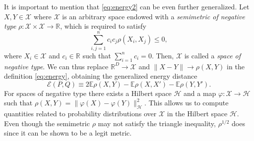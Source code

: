 \documentclass[aps,preprint,nofootinbib,floatfix]{revtex4-1}
\newcommand\Energy{\mathcal{E}}
\newcommand\E{\mathbb{E}}
\begin{document}
It is important to 
mention that \eqref{eq:energy2} can be even further generalized.
Let $X, Y \in \mathcal{X}$  where $\mathcal{X}$ is an arbitrary space endowed
with a \emph{semimetric of negative type}
$\rho: \mathcal{X}\times\mathcal{X} \to \mathbb{R}$, which is required
to satisfy
\begin{equation}
\label{eq:negative_type}
\sum_{i,j=1}^n c_i c_j \rho(X_i, X_j) \le 0,
\end{equation}
where $X_i \in \mathcal{X}$ and $c_i \in \mathbb{R}$ such that
$\sum_{i=1}^n c_i = 0$. Then, $\mathcal{X}$ is called a \emph{space of
negative type}.
We can thus replace $\mathbb{R}^D \to \mathcal{X}$ and 
$\| X - Y \| \to \rho(X , Y)$ in the definition \eqref{eq:energy}, obtaining
the generalized energy distance
\begin{equation}
\label{eq:energy3}
\Energy(P, Q) \equiv 2 \E \rho(X,Y) - \E \rho(X, X') - \E \rho(Y,Y').
\end{equation}
For spaces of negative type there exists a Hilbert space $\mathcal{H}$ and
a map $\varphi: \mathcal{X} \to
\mathcal{H}$ such that
$\rho(X, Y) = \| \varphi(X) - \varphi(Y) \|_{\mathcal{H}}^2$. This
allows us to compute quantities related to probability distributions over
$\mathcal{X}$ in the Hilbert space $\mathcal{H}$.
Even though the semimetric 
$\rho$ may not satisfy the triangle inequality, 
$\rho^{1/2}$ does since it can be shown to be a legit metric. 
\end{document}
